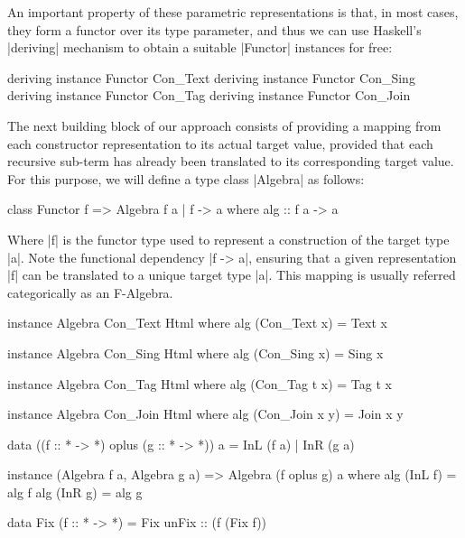 An important property of these parametric representations is that, in most
cases, they form a functor over its type parameter, and thus we can use
Haskell's |deriving| mechanism to obtain a suitable |Functor| instances for
free:

\begin{code}
deriving instance Functor Con_Text
deriving instance Functor Con_Sing
deriving instance Functor Con_Tag
deriving instance Functor Con_Join
\end{code}


%
The next building block of our approach consists of providing a mapping from
each constructor representation to its actual target value, provided that each
recursive sub-term has already been translated to its corresponding target
value.
%
For this purpose, we will define a type class |Algebra| as follows:

\begin{code}
class Functor f => Algebra f a | f -> a where
  alg :: f a -> a
\end{code}

Where |f| is the functor type used to represent a construction of the target
type |a|.
%
Note the functional dependency |f -> a|, ensuring that a given representation
|f| can be translated to a unique target type |a|.
%
This mapping is usually referred categorically as an F-Algebra.
%




\begin{code}
instance Algebra Con_Text Html where
  alg (Con_Text x) = Text x

instance Algebra Con_Sing Html where
  alg (Con_Sing x) = Sing x

instance Algebra Con_Tag Html where
  alg (Con_Tag t x) = Tag t x

instance Algebra Con_Join Html where
  alg (Con_Join x y) = Join x y
\end{code}


\begin{code}
data ((f :: * -> *) oplus (g :: * -> *)) a = InL (f a) | InR (g a)
\end{code}


\begin{code}
instance (Algebra f a, Algebra g a)
  => Algebra (f oplus g) a where
  alg (InL f) = alg f
  alg (InR g) = alg g
\end{code}


\begin{code}
  data Fix (f :: * -> *) = Fix { unFix :: (f (Fix f)) }
\end{code}

